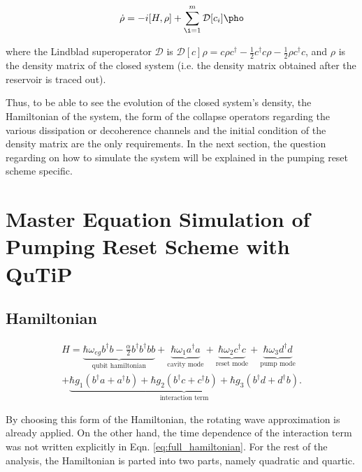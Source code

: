 \begin{equation}
    \Dot{\rho} = -i[H,\rho] + \sum_{\i=1}^{m} \mathcal{D}[c_i]\pho
\end{equation}

where the Lindblad superoperator $\mathcal{D}$ is $\mathcal{D}[c]\rho = c\rho c^\dagger - \frac{1}{2}c^\dagger c \rho -\frac{1}{2} \rho c^\dagger c$, and $\rho$ is the density matrix of the closed system (i.e. the density matrix obtained after the reservoir is traced out).

Thus, to be able to see the evolution of the closed system's density, the Hamiltonian of the system, the form of the collapse operators regarding the various dissipation or decoherence channels and the initial condition of the density matrix are the only requirements. In the next section, the question regarding on how to simulate the system will be explained in the pumping reset scheme specific.


\section{Master Equation Simulation of Pumping Reset Scheme with QuTiP }

\maketitle
	
\subsection{Hamiltonian}

	\begin{equation} \label{eq:full_hamiltonian}
	\begin{split}
		H = \underbrace{\hbar \omega_{eg}b^\dagger b - \frac{\alpha}{2} b^\dagger b ^\dagger b b }_{\text{qubit hamiltonian}}+ \underbrace{\hbar \omega_{1} a ^ \dagger a}_{\text{cavity mode}} + \underbrace{\hbar \omega_{2} c ^\dagger c}_{\text{reset mode}} + \underbrace{\hbar \omega_{3} d ^\dagger d}_{\text{pump mode}} \\
		+\underbrace{\hbar  g_1(b^\dagger a + a ^\dagger b) + \hbar g_2(b^\dagger c + c^\dagger b) + \hbar g_3(b^\dagger d + d^\dagger b)}_{\text{interaction term}}.
    \end{split}
	\end{equation}

	By choosing this form of the Hamiltonian, the rotating wave approximation is already applied. On the other hand, the time dependence of the interaction term was not written explicitly in Eqn. \ref{eq:full_hamiltonian}. For the rest of the analysis, the Hamiltonian is parted into two parts, namely quadratic and quartic.
	
